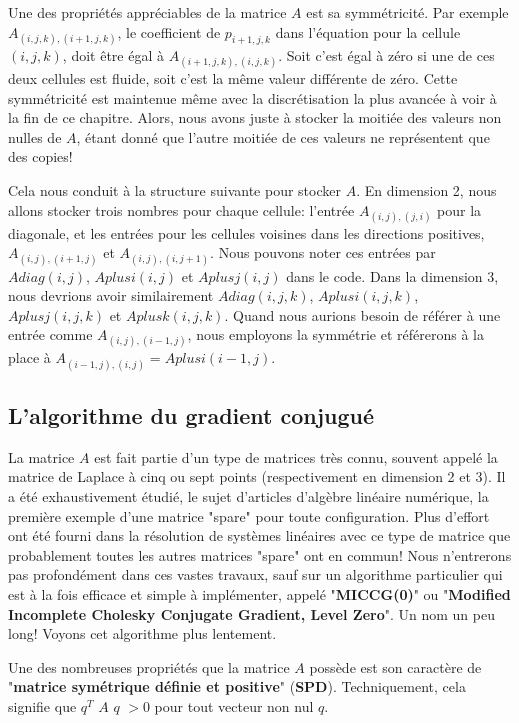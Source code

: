 \documentclass[11pt]{report}
\begin{document}
Une des propriétés appréciables de la matrice $A$ est sa symmétricité. Par exemple $A_{(i,j,k),(i+1,j,k)}$, le coefficient de $p_{i+1,j,k}$ dans l'équation pour la cellule $(i,j,k)$, doit être égal à $A_{(i+1,j,k),(i,j,k)}$. Soit c'est égal à zéro si une de ces deux cellules est fluide, soit c'est la même valeur différente de zéro. Cette symmétricité est maintenue même avec la discrétisation la plus avancée à voir à la fin de ce chapitre. Alors, nous avons juste à stocker la moitiée des valeurs non nulles de $A$, étant donné que l'autre moitiée de ces valeurs ne représentent que des copies! \newline

Cela nous conduit à la structure suivante pour stocker $A$. En dimension 2, nous allons stocker trois nombres pour chaque cellule: l'entrée $A_{(i,j),(j,i)}$ pour la diagonale, et les entrées pour les cellules voisines dans les directions positives, $A_{(i,j),(i+1,j)}$ et $A_{(i,j), (i,j+1)}$.  Nous pouvons noter ces entrées par  $Adiag(i,j)$, $Aplusi(i,j)$ et $Aplusj(i,j)$ dans le code. Dans la dimension 3, nous devrions avoir similairement $Adiag(i,j,k)$, $Aplusi(i,j,k)$, $Aplusj(i,j,k)$ et $Aplusk(i,j,k)$. Quand nous aurions besoin de référer à une entrée comme $A_{(i,j),(i-1,j)}$, nous employons la symmétrie et référerons à la place à $A_{(i-1,j),(i,j)} = Aplusi(i-1,j)$.

\subsection{L'algorithme du gradient conjugué}

La matrice $A$ est fait partie d'un type de matrices très connu, souvent appelé la matrice de Laplace à cinq ou sept points (respectivement en dimension 2 et 3). Il a été exhaustivement étudié, le sujet d'articles d'algèbre linéaire numérique, la première exemple d'une matrice "spare" pour toute configuration. Plus d'effort ont été fourni dans la résolution de systèmes linéaires avec ce type de matrice que probablement toutes les autres matrices "spare" ont en commun! Nous n'entrerons pas profondément dans ces vastes travaux, sauf sur un algorithme particulier qui est à la fois efficace et simple à implémenter, appelé "\textbf{MICCG(0)}" ou "\textbf{Modified Incomplete Cholesky Conjugate Gradient, Level Zero}". Un nom un peu long! Voyons cet algorithme plus lentement. \newline

Une des nombreuses propriétés que la matrice $A$ possède est son caractère de "\textbf{matrice symétrique définie et positive}" (\textbf{SPD}). Techniquement, cela signifie que $q^T\,\, A \,\,q\,\, > 0$ pour tout vecteur non nul $q$. \newline
\end{document}
